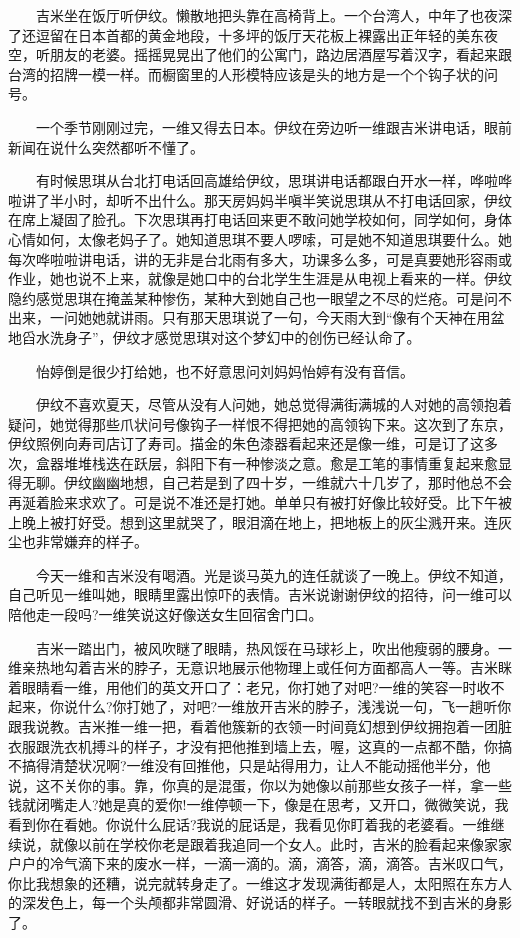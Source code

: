 \documentclass[12pt,UTF8]{ctexbook}
\begin{document}
　　吉米坐在饭厅听伊纹。懒散地把头靠在高椅背上。一个台湾人，中年了也夜深了还逗留在日本首都的黄金地段，十多坪的饭厅天花板上裸露出正年轻的美东夜空，听朋友的老婆。摇摇晃晃出了他们的公寓门，路边居酒屋写着汉字，看起来跟台湾的招牌一模一样。而橱窗里的人形模特应该是头的地方是一个个钩子状的问号。

　　一个季节刚刚过完，一维又得去日本。伊纹在旁边听一维跟吉米讲电话，眼前新闻在说什么突然都听不懂了。

　　有时候思琪从台北打电话回高雄给伊纹，思琪讲电话都跟白开水一样，哗啦哗啦讲了半小时，却听不出什么。那天房妈妈半嗔半笑说思琪从不打电话回家，伊纹在席上凝固了脸孔。下次思琪再打电话回来更不敢问她学校如何，同学如何，身体心情如何，太像老妈子了。她知道思琪不要人啰嗦，可是她不知道思琪要什么。她每次哗啦啦讲电话，讲的无非是台北雨有多大，功课多么多，可是真要她形容雨或作业，她也说不上来，就像是她口中的台北学生生涯是从电视上看来的一样。伊纹隐约感觉思琪在掩盖某种惨伤，某种大到她自己也一眼望之不尽的烂疮。可是问不出来，一问她她就讲雨。只有那天思琪说了一句，今天雨大到\enquote{像有个天神在用盆地舀水洗身子}，伊纹才感觉思琪对这个梦幻中的创伤已经认命了。

　　怡婷倒是很少打给她，也不好意思问刘妈妈怡婷有没有音信。

　　伊纹不喜欢夏天，尽管从没有人问她，她总觉得满街满城的人对她的高领抱着疑问，她觉得那些爪状问号像钩子一样恨不得把她的高领钩下来。这次到了东京，伊纹照例向寿司店订了寿司。描金的朱色漆器看起来还是像一维，可是订了这多次，盒器堆堆栈迭在跃层，斜阳下有一种惨淡之意。愈是工笔的事情重复起来愈显得无聊。伊纹幽幽地想，自己若是到了四十岁，一维就六十几岁了，那时他总不会再涎着脸来求欢了。可是说不准还是打她。单单只有被打好像比较好受。比下午被上晚上被打好受。想到这里就哭了，眼泪滴在地上，把地板上的灰尘溅开来。连灰尘也非常嫌弃的样子。

　　今天一维和吉米没有喝酒。光是谈马英九的连任就谈了一晚上。伊纹不知道，自己听见一维叫她，眼睛里露出惊吓的表情。吉米说谢谢伊纹的招待，问一维可以陪他走一段吗?一维笑说这好像送女生回宿舍门口。

　　吉米一踏出门，被风吹瞇了眼睛，热风馁在马球衫上，吹出他瘦弱的腰身。一维亲热地勾着吉米的脖子，无意识地展示他物理上或任何方面都高人一等。吉米眯着眼睛看一维，用他们的英文开口了：老兄，你打她了对吧?一维的笑容一时收不起来，你说什么?你打她了，对吧?一维放开吉米的脖子，浅浅说一句，飞一趟听你跟我说教。吉米推一维一把，看着他簇新的衣领一时间竟幻想到伊纹拥抱着一团脏衣服跟洗衣机搏斗的样子，才没有把他推到墙上去，喔，这真的一点都不酷，你搞不搞得清楚状况啊?一维没有回推他，只是站得用力，让人不能动摇他半分，他说，这不关你的事。靠，你真的是混蛋，你以为她像以前那些女孩子一样，拿一些钱就闭嘴走人?她是真的爱你!一维停顿一下，像是在思考，又开口，微微笑说，我看到你在看她。你说什么屁话?我说的屁话是，我看见你盯着我的老婆看。一维继续说，就像以前在学校你老是跟着我追同一个女人。此时，吉米的脸看起来像家家户户的冷气滴下来的废水一样，一滴一滴的。滴，滴答，滴，滴答。吉米叹口气，你比我想象的还糟，说完就转身走了。一维这才发现满街都是人，太阳照在东方人的深发色上，每一个头颅都非常圆滑、好说话的样子。一转眼就找不到吉米的身影了。
\end{document}
